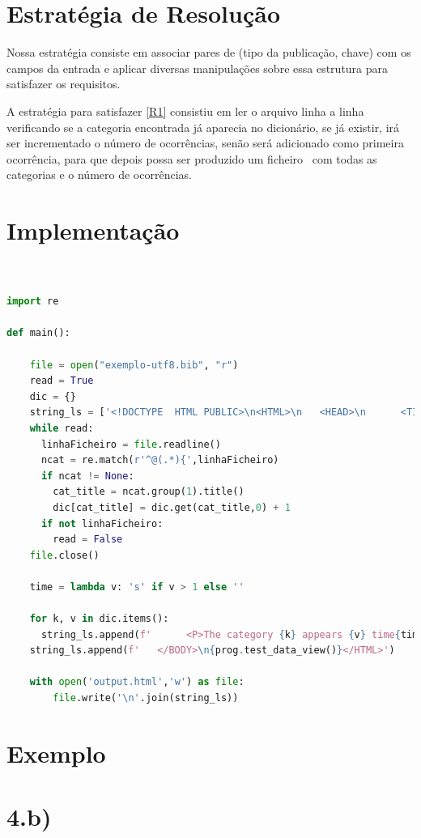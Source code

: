 \documentclass[11pt,a4paper]{report}
\begin{document}
\section{Estratégia de Resolução}

Nossa estratégia consiste em associar pares de (tipo da publicação, chave) com os campos da entrada e aplicar diversas manipulações sobre essa estrutura para satisfazer os requisitos.

A estratégia para satisfazer \ref{R1} consistiu em ler o arquivo linha a linha verificando se a categoria encontrada já aparecia no dicionário, se já existir, irá ser incrementado o número de ocorrências, senão será adicionado como primeira ocorrência, para que depois possa ser produzido um ficheiro \htlm \ com todas as categorias e o número de ocorrências.

\section{Implementação}


\begin{lstlisting}[language=python]


import re

def main():
    
    file = open("exemplo-utf8.bib", "r")
    read = True
    dic = {}
    string_ls = ['<!DOCTYPE  HTML PUBLIC>\n<HTML>\n   <HEAD>\n      <TITLE>Categories in BibTeX</TITLE>\n   </HEAD>\n   <BODY>']
    while read:
      linhaFicheiro = file.readline()
      ncat = re.match(r'^@(.*){',linhaFicheiro)
      if ncat != None:
        cat_title = ncat.group(1).title()
        dic[cat_title] = dic.get(cat_title,0) + 1
      if not linhaFicheiro:
        read = False
    file.close()

    time = lambda v: 's' if v > 1 else ''

    for k, v in dic.items():
      string_ls.append(f'      <P>The category {k} appears {v} time{time(v)}.</P>')
    string_ls.append(f'   </BODY>\n{prog.test_data_view()}</HTML>')

    with open('output.html','w') as file:
        file.write('\n'.join(string_ls))
\end{lstlisting}

\section{Exemplo}
\section{4.b)}
\end{document}
